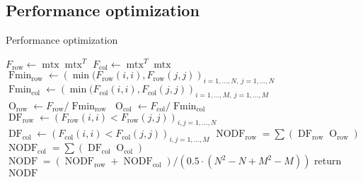 \documentclass{beamer}
\DeclareMathOperator{\mtx}{mtx}
\DeclareMathOperator{\NODF}{NODF}
\DeclareMathOperator{\Olap}{O}
\DeclareMathOperator{\DF}{DF}
\DeclareMathOperator{\row}{row}
\DeclareMathOperator{\col}{col}
\DeclareMathOperator{\Fmin}{Fmin}
\begin{document}
\subsection{Performance optimization}
\begin{frame}{Performance optimization}
    \begin{algorithm}[H]
        \begin{algorithmic}[1] %
            \State $F_{\row} \gets \mtx \mtx^T$ 
            \State $F_{\col} \gets \mtx^T \mtx$
            \State $\Fmin_{\row} \gets \left(  \min(F_{\row}(i,i), F_{\row}(j,j)
                \right)_{i = 1,\ldots,N,~j = 1,\ldots,N}$
            \State $\Fmin_{\col} \gets \left(  \min(F_{\col}(i,i), F_{\col}(j,j)
                \right)_{i = 1,\ldots,M,~j = 1,\ldots,M}$
            \State $\Olap_{\row} \gets F_{\row}/\Fmin_{\row}$
            \State $\Olap_{\col} \gets F_{\col}/\Fmin_{\col}$
            \State $\DF_{\row} \gets \left( F_{\row}(i,i) < F_{\row}(j,j)
                \right)_{i,j = 1,\ldots,N}$
            \State $\DF_{\col} \gets \left( F_{\col}(i,i) < F_{\col}(j,j)
                \right)_{i,j = 1,\ldots,M}$
            \State $\NODF_{\row} = \sum(\DF_{\row} \Olap_{\row})$
            \State $\NODF_{\col} = \sum(\DF_{\col} \Olap_{\col})$
            \State $\NODF = (\NODF_{\row} + \NODF_{\col}) / (0.5 \cdot(N^2 -N + M^2 -M))$
            \State return $\NODF$
        \end{algorithmic}
        \caption{$\NODF(\mtx)$}
    \end{algorithm}
\end{frame}
\end{document}
